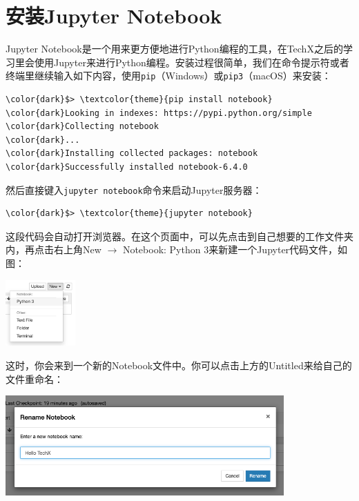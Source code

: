 \documentclass{article}
\begin{document}
\section{安装Jupyter Notebook}
Jupyter Notebook是一个用来更方便地进行Python编程的工具，在TechX之后的学习里会使用Jupyter来进行Python编程。安装过程很简单，我们在命令提示符或者终端里继续输入如下内容，使用\texttt{pip}（Windows）或\texttt{pip3}（macOS）来安装：
\begin{Verbatim}[commandchars=\\\{\},xleftmargin=1.5cm]
\color{dark}$> \textcolor{theme}{pip install notebook}
\color{dark}Looking in indexes: https://pypi.python.org/simple
\color{dark}Collecting notebook
\color{dark}...
\color{dark}Installing collected packages: notebook
\color{dark}Successfully installed notebook-6.4.0
\end{Verbatim}

然后直接键入\texttt{jupyter notebook}命令来启动Jupyter服务器：
\begin{Verbatim}[commandchars=\\\{\},xleftmargin=1.5cm]
\color{dark}$> \textcolor{theme}{jupyter notebook}
\end{Verbatim}

这段代码会自动打开浏览器。在这个页面中，可以先点击到自己想要的工作文件夹内，再点击右上角New $\rightarrow$ Notebook: Python 3来新建一个Jupyter代码文件，如图：

\vspace*{0.3cm}\centerline{\noindent\includegraphics[width=0.2\textwidth]{new-ipynb.png}}

这时，你会来到一个新的Notebook文件中。你可以点击上方的Untitled来给自己的文件重命名：

\vspace*{0.3cm}\centerline{\noindent\includegraphics[width=0.8\textwidth]{ipynb-rename.png}}
\end{document}
